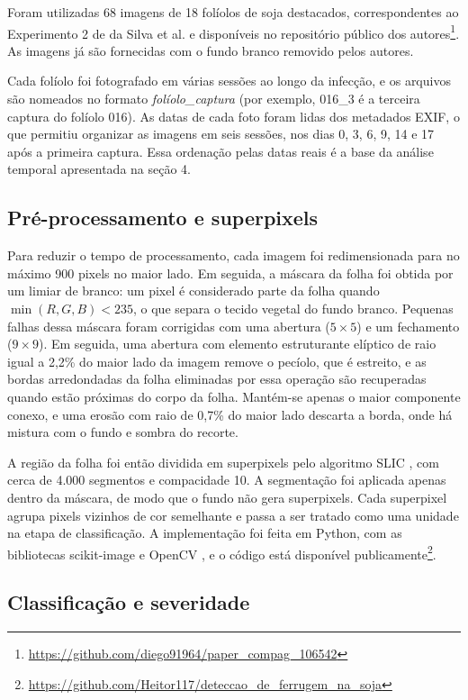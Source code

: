 \documentclass[10pt,a4paper,twocolumn]{article}
\begin{document}
Foram utilizadas 68 imagens de 18 folíolos de soja destacados,
correspondentes ao Experimento 2 de da Silva et al. \cite{dasilva2022} e
disponíveis no repositório público dos autores\footnote{\url{https://github.com/diego91964/paper_compag_106542}}.
As imagens já são fornecidas com o fundo branco removido pelos autores.

Cada folíolo foi fotografado em várias sessões ao longo da infecção, e
os arquivos são nomeados no formato \textit{folíolo\_captura} (por
exemplo, 016\_3 é a terceira captura do folíolo 016). As datas de cada
foto foram lidas dos metadados EXIF, o que permitiu organizar as imagens
em seis sessões, nos dias 0, 3, 6, 9, 14 e 17 após a primeira captura.
Essa ordenação pelas datas reais é a base da análise temporal
apresentada na seção 4.

\subsection{Pré-processamento e superpixels}

Para reduzir o tempo de processamento, cada imagem foi redimensionada
para no máximo 900 pixels no maior lado. Em seguida, a máscara da folha
foi obtida por um limiar de branco: um pixel é considerado parte da
folha quando $\min(R,G,B) < 235$, o que separa o tecido vegetal do fundo
branco. Pequenas falhas dessa máscara foram corrigidas com uma abertura
($5\times5$) e um fechamento ($9\times9$). Em seguida, uma abertura com
elemento estruturante elíptico de raio igual a 2,2\% do maior lado da
imagem remove o pecíolo, que é estreito, e as bordas arredondadas da
folha eliminadas por essa operação são recuperadas quando estão próximas
do corpo da folha. Mantém-se apenas o maior componente conexo, e uma
erosão com raio de 0,7\% do maior lado descarta a borda, onde há mistura
com o fundo e sombra do recorte.

A região da folha foi então dividida em superpixels pelo algoritmo SLIC
\cite{achanta2012}, com cerca de 4.000 segmentos e compacidade 10. A
segmentação foi aplicada apenas dentro da máscara, de modo que o fundo
não gera superpixels. Cada superpixel agrupa pixels vizinhos de cor
semelhante e passa a ser tratado como uma unidade na etapa de
classificação. A implementação foi feita em Python, com as bibliotecas
scikit-image \cite{skimage2014} e OpenCV \cite{opencv2000}, e o código
está disponível publicamente\footnote{\url{https://github.com/Heitor117/deteccao_de_ferrugem_na_soja}}.

\subsection{Classificação e severidade}
\end{document}
